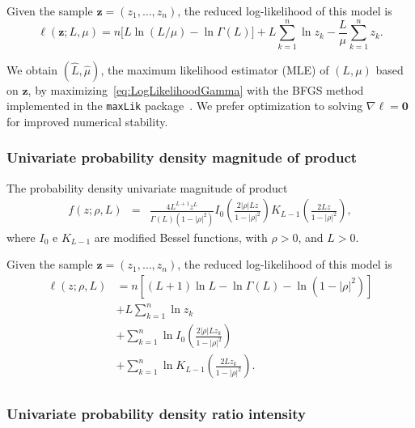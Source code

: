 \documentclass[journal]{IEEEtran}
\begin{document}
Given the sample $\bm z = (z_1,\dots,z_n)$,
the reduced log-likelihood of this model is
\begin{equation}
\ell(\bm z; L,\mu) = 
n \big[L\ln (L / \mu) - \ln \Gamma(L)\big]
+L \sum_{k=1}^{n}\ln z_k -\frac{L}{\mu}\sum_{k=1}^{n} z_k.
\label{eq:LogLikelihoodGamma}
\end{equation}

We obtain $(\widehat L, \widehat \mu)$, the maximum likelihood estimator (MLE) of $(L, \mu)$ based on $\bm z$, by maximizing~\eqref{eq:LogLikelihoodGamma} with the BFGS method implemented in the \texttt{maxLik} package~\cite{ht}.
We prefer optimization to solving $\nabla\ell=\bm 0$ for improved numerical stability.


\subsubsection{Univariate probability density magnitude of product}

The probability density univariate magnitude of product
\begin{equation}\label{eq:pdf_mag_prod}
\begin{array}{lcl}
	f(z;\rho, L)&=&\frac{4L^{L+1} z^L}{\Gamma(L)(1-|\rho|^2)}I_0\left(\frac{2|\rho|L z}{1-|\rho|^2}\right)K_{L-1}\left(\frac{2L z}{1-|\rho|^2}\right),
		\end{array}
\end{equation}
where $I_0$ e $K_{L-1}$ are modified Bessel functions, with $\rho>0$, and $L>0$.

Given the sample $\bm z = (z_1,\dots,z_n)$, the reduced log-likelihood of this model is
\begin{equation}\label{eq:eq_log_vero_mag_prod_red}
\begin{split}
    \ell(z;\rho, L)&=n\left[(L+1)\ln L-\ln\Gamma(L)-\ln(1-|\rho|^2)\right]\\
                         &+L\sum_{k=1}^{n} \ln z_k\\
                         &+\sum_{k=1}^{n}\ln I_0\left(\frac{2|\rho|L z_k}{1-|\rho|^2}\right)\\
                         &+ \sum_{k=1}^{n}\ln K_{L-1}\left(\frac{2L z_k}{1-|\rho|^2}\right).\\
\end{split}
 \end{equation} 
%
\subsubsection{Univariate probability density ratio intensity}
\end{document}
